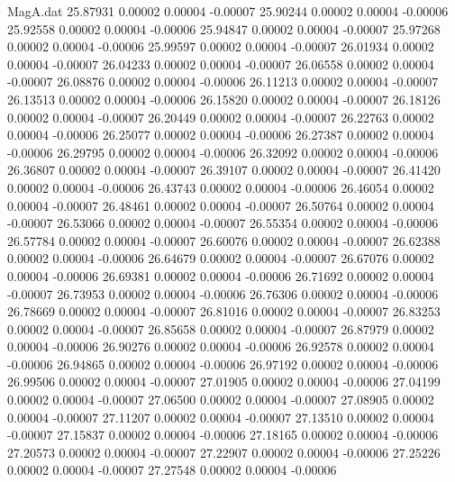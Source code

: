 \begin{filecontents}{MagA.dat}
  25.87931    0.00002    0.00004   -0.00007
  25.90244    0.00002    0.00004   -0.00006
  25.92558    0.00002    0.00004   -0.00006
  25.94847    0.00002    0.00004   -0.00007
  25.97268    0.00002    0.00004   -0.00006
  25.99597    0.00002    0.00004   -0.00007
  26.01934    0.00002    0.00004   -0.00007
  26.04233    0.00002    0.00004   -0.00007
  26.06558    0.00002    0.00004   -0.00007
  26.08876    0.00002    0.00004   -0.00006
  26.11213    0.00002    0.00004   -0.00007
  26.13513    0.00002    0.00004   -0.00006
  26.15820    0.00002    0.00004   -0.00007
  26.18126    0.00002    0.00004   -0.00007
  26.20449    0.00002    0.00004   -0.00007
  26.22763    0.00002    0.00004   -0.00006
  26.25077    0.00002    0.00004   -0.00006
  26.27387    0.00002    0.00004   -0.00006
  26.29795    0.00002    0.00004   -0.00006
  26.32092    0.00002    0.00004   -0.00006
  26.36807    0.00002    0.00004   -0.00007
  26.39107    0.00002    0.00004   -0.00007
  26.41420    0.00002    0.00004   -0.00006
  26.43743    0.00002    0.00004   -0.00006
  26.46054    0.00002    0.00004   -0.00007
  26.48461    0.00002    0.00004   -0.00007
  26.50764    0.00002    0.00004   -0.00007
  26.53066    0.00002    0.00004   -0.00007
  26.55354    0.00002    0.00004   -0.00006
  26.57784    0.00002    0.00004   -0.00007
  26.60076    0.00002    0.00004   -0.00007
  26.62388    0.00002    0.00004   -0.00006
  26.64679    0.00002    0.00004   -0.00007
  26.67076    0.00002    0.00004   -0.00006
  26.69381    0.00002    0.00004   -0.00006
  26.71692    0.00002    0.00004   -0.00007
  26.73953    0.00002    0.00004   -0.00006
  26.76306    0.00002    0.00004   -0.00006
  26.78669    0.00002    0.00004   -0.00007
  26.81016    0.00002    0.00004   -0.00007
  26.83253    0.00002    0.00004   -0.00007
  26.85658    0.00002    0.00004   -0.00007
  26.87979    0.00002    0.00004   -0.00006
  26.90276    0.00002    0.00004   -0.00006
  26.92578    0.00002    0.00004   -0.00006
  26.94865    0.00002    0.00004   -0.00006
  26.97192    0.00002    0.00004   -0.00006
  26.99506    0.00002    0.00004   -0.00007
  27.01905    0.00002    0.00004   -0.00006
  27.04199    0.00002    0.00004   -0.00007
  27.06500    0.00002    0.00004   -0.00007
  27.08905    0.00002    0.00004   -0.00007
  27.11207    0.00002    0.00004   -0.00007
  27.13510    0.00002    0.00004   -0.00007
  27.15837    0.00002    0.00004   -0.00006
  27.18165    0.00002    0.00004   -0.00006
  27.20573    0.00002    0.00004   -0.00007
  27.22907    0.00002    0.00004   -0.00006
  27.25226    0.00002    0.00004   -0.00007
  27.27548    0.00002    0.00004   -0.00006

\end{filecontents}
